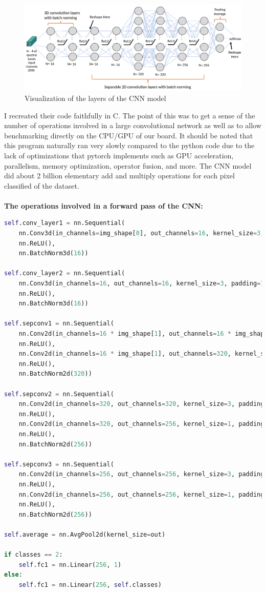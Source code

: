 \documentclass[psamsfonts]{amsart}
\theoremstyle{definition}
\theoremstyle{remark}
\numberwithin{equation}{section}
\begin{document}
\begin{figure}[H]
  \centering
  \includegraphics[scale=0.25]{cnn_arch.png}
  \caption{Visualization of the layers of the CNN model \cite{dirk-presentation}}
\end{figure}

I recreated their code faithfully in C. The point of this was to get a sense of the number of operations involved in a large convolutional network as well as to allow benchmarking directly on the CPU/GPU of our board. It should be noted that this program naturally ran very slowly compared to the python code due to the lack of optimizations that pytorch implements such as GPU acceleration, parallelism, memory optimization, operator fusion, and more. The CNN model did about 2 billion elementary add and multiply operations for each pixel classified of the dataset.\\\\
\textbf{The operations involved in a forward pass of the CNN:}
\begin{lstlisting}[language=python]
self.conv_layer1 = nn.Sequential(
    nn.Conv3d(in_channels=img_shape[0], out_channels=16, kernel_size=3, padding=1),
    nn.ReLU(),
    nn.BatchNorm3d(16))

self.conv_layer2 = nn.Sequential(
    nn.Conv3d(in_channels=16, out_channels=16, kernel_size=3, padding=1),
    nn.ReLU(),
    nn.BatchNorm3d(16))

self.sepconv1 = nn.Sequential(
    nn.Conv2d(in_channels=16 * img_shape[1], out_channels=16 * img_shape[1], kernel_size=5, padding=2, groups=16 * img_shape[1]),
    nn.ReLU(),
    nn.Conv2d(in_channels=16 * img_shape[1], out_channels=320, kernel_size=1, padding=0),
    nn.ReLU(),
    nn.BatchNorm2d(320))

self.sepconv2 = nn.Sequential(
    nn.Conv2d(in_channels=320, out_channels=320, kernel_size=3, padding=1, stride=stride, groups=320),
    nn.ReLU(),
    nn.Conv2d(in_channels=320, out_channels=256, kernel_size=1, padding=0),
    nn.ReLU(),
    nn.BatchNorm2d(256))

self.sepconv3 = nn.Sequential(
    nn.Conv2d(in_channels=256, out_channels=256, kernel_size=3, padding=1, stride=stride, groups=256),
    nn.ReLU(),
    nn.Conv2d(in_channels=256, out_channels=256, kernel_size=1, padding=0),
    nn.ReLU(),
    nn.BatchNorm2d(256))

self.average = nn.AvgPool2d(kernel_size=out)

if classes == 2:
    self.fc1 = nn.Linear(256, 1)
else:
    self.fc1 = nn.Linear(256, self.classes)
\end{lstlisting}
\end{document}
